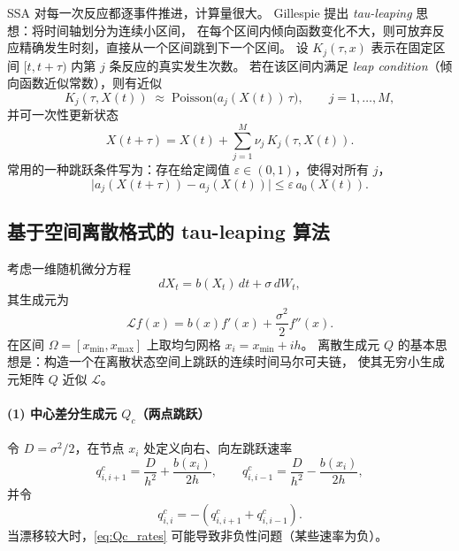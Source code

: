 	SSA 对每一次反应都逐事件推进，计算量很大。
	Gillespie 提出 \textit{tau-leaping} 思想：将时间轴划分为连续小区间，
	在每个区间内倾向函数变化不大，则可放弃反应精确发生时刻，直接从一个区间跳到下一个区间。
	设 $K_j(\tau,x)$ 表示在固定区间 $[t,t+\tau)$ 内第 $j$ 条反应的真实发生次数。
	若在该区间内满足 \textit{leap condition}（倾向函数近似常数），则有近似
	\begin{equation}\tag{2.15}\label{eq:Poisson_leap}
		K_j(\tau,X(t)) \;\approx\; \mathrm{Poisson}\bigl(a_j(X(t))\,\tau\bigr),
		\qquad j=1,\dots,M,
	\end{equation}
	并可一次性更新状态
	\begin{equation}\tag{2.16}\label{eq:leap_update}
		X(t+\tau)
		=
		X(t)+\sum_{j=1}^M \nu_j\,K_j(\tau,X(t)).
	\end{equation}
	常用的一种跳跃条件写为：存在给定阈值 $\varepsilon\in(0,1)$，使得对所有 $j$，
	\begin{equation}\tag{2.17}\label{eq:leap_condition}
		\bigl|a_j(X(t+\tau)) - a_j(X(t))\bigr|
		\le
		\varepsilon\,a_0(X(t)).
	\end{equation}
	
	\subsection{基于空间离散格式的 tau-leaping 算法}
	
	考虑一维随机微分方程
	\begin{equation}\label{eq:SDE_1d}
		dX_t=b(X_t)\,dt+\sigma\,dW_t,
	\end{equation}
	其生成元为
	\[
	\mathcal{L}f(x)=b(x)f'(x)+\frac{\sigma^2}{2}f''(x).
	\]
	在区间 $\Omega=[x_{\min},x_{\max}]$ 上取均匀网格 $x_i=x_{\min}+ih$。
	离散生成元 $Q$ 的基本思想是：构造一个在离散状态空间上跳跃的连续时间马尔可夫链，
	使其无穷小生成元矩阵 $Q$ 近似 $\mathcal{L}$。
	
	\paragraph{(1) 中心差分生成元 $Q_c$（两点跳跃）}
	令 $D=\sigma^2/2$，在节点 $x_i$ 处定义向右、向左跳跃速率
	\begin{equation}\label{eq:Qc_rates}
		q^{c}_{i,i+1}=\frac{D}{h^2}+\frac{b(x_i)}{2h},\qquad
		q^{c}_{i,i-1}=\frac{D}{h^2}-\frac{b(x_i)}{2h},
	\end{equation}
	并令
	\[
	q^{c}_{i,i}=-(q^{c}_{i,i+1}+q^{c}_{i,i-1}).
	\]
	当漂移较大时，\eqref{eq:Qc_rates} 可能导致非负性问题（某些速率为负）。
	
